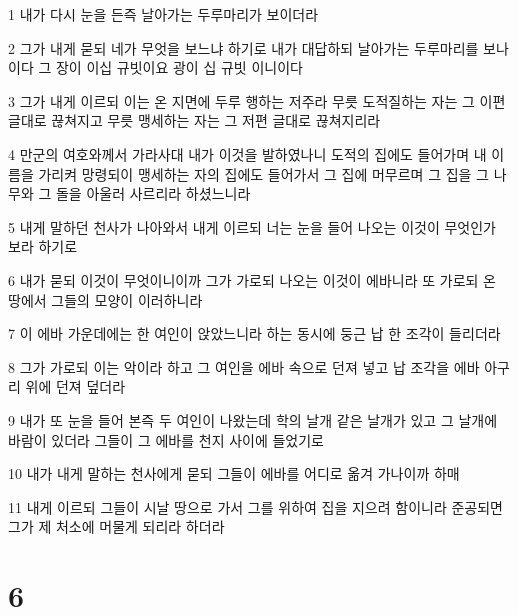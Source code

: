 \par 1 내가 다시 눈을 든즉 날아가는 두루마리가 보이더라
\par 2 그가 내게 묻되 네가 무엇을 보느냐 하기로 내가 대답하되 날아가는 두루마리를 보나이다 그 장이 이십 규빗이요 광이 십 규빗 이니이다
\par 3 그가 내게 이르되 이는 온 지면에 두루 행하는 저주라 무릇 도적질하는 자는 그 이편 글대로 끊쳐지고 무릇 맹세하는 자는 그 저편 글대로 끊쳐지리라
\par 4 만군의 여호와께서 가라사대 내가 이것을 발하였나니 도적의 집에도 들어가며 내 이름을 가리켜 망령되이 맹세하는 자의 집에도 들어가서 그 집에 머무르며 그 집을 그 나무와 그 돌을 아울러 사르리라 하셨느니라
\par 5 내게 말하던 천사가 나아와서 내게 이르되 너는 눈을 들어 나오는 이것이 무엇인가 보라 하기로
\par 6 내가 묻되 이것이 무엇이니이까 그가 가로되 나오는 이것이 에바니라 또 가로되 온 땅에서 그들의 모양이 이러하니라
\par 7 이 에바 가운데에는 한 여인이 앉았느니라 하는 동시에 둥근 납 한 조각이 들리더라
\par 8 그가 가로되 이는 악이라 하고 그 여인을 에바 속으로 던져 넣고 납 조각을 에바 아구리 위에 던져 덮더라
\par 9 내가 또 눈을 들어 본즉 두 여인이 나왔는데 학의 날개 같은 날개가 있고 그 날개에 바람이 있더라 그들이 그 에바를 천지 사이에 들었기로
\par 10 내가 내게 말하는 천사에게 묻되 그들이 에바를 어디로 옮겨 가나이까 하매
\par 11 내게 이르되 그들이 시날 땅으로 가서 그를 위하여 집을 지으려 함이니라 준공되면 그가 제 처소에 머물게 되리라 하더라

\chapter{6}

